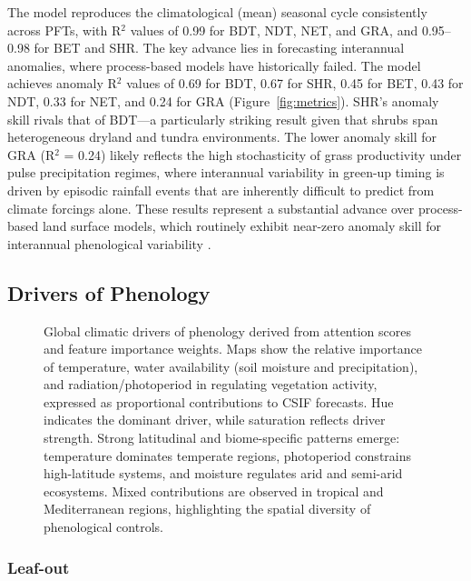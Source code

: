 \documentclass[pdflatex,sn-mathphys-num]{sn-jnl}%
\theoremstyle{thmstyleone}%
\theoremstyle{thmstyletwo}%
\theoremstyle{thmstylethree}%
\begin{document}
The model reproduces the climatological (mean) seasonal cycle consistently across PFTs, with R$^2$ values of 0.99 for BDT, NDT, NET, and GRA, and 0.95--0.98 for BET and SHR. The key advance lies in forecasting interannual anomalies, where process-based models have historically failed. The model achieves anomaly R$^2$ values of 0.69 for BDT, 0.67 for SHR, 0.45 for BET, 0.43 for NDT, 0.33 for NET, and 0.24 for GRA (Figure~\ref{fig:metrics}). SHR's anomaly skill rivals that of BDT—a particularly striking result given that shrubs span heterogeneous dryland and tundra environments. The lower anomaly skill for GRA (R$^2$ = 0.24) likely reflects the high stochasticity of grass productivity under pulse precipitation regimes, where interannual variability in green-up timing is driven by episodic rainfall events that are inherently difficult to predict from climate forcings alone. These results represent a substantial advance over process-based land surface models, which routinely exhibit near-zero anomaly skill for interannual phenological variability \citep{richardson_terrestrial_2012, peano_plant_2021}.

\subsection{Drivers of Phenology}\label{subsec2}

\begin{figure}[h!]
        \centering
        
        \caption{Global climatic drivers of phenology derived from attention scores and feature importance weights. Maps show the relative importance of temperature, water availability (soil moisture and precipitation), and radiation/photoperiod in regulating vegetation activity, expressed as proportional contributions to CSIF forecasts. Hue indicates the dominant driver, while saturation reflects driver strength. Strong latitudinal and biome-specific patterns emerge: temperature dominates temperate regions, photoperiod constrains high-latitude systems, and moisture regulates arid and semi-arid ecosystems. Mixed contributions are observed in tropical and Mediterranean regions, highlighting the spatial diversity of phenological controls.}
        \label{fig:drivers}
    \end{figure}
\subsubsection{Leaf-out }\label{subsubsec2}
\end{document}
